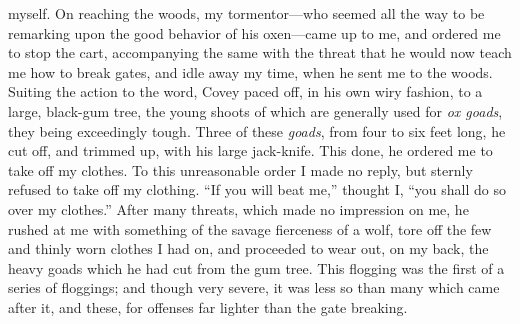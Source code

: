 myself. On reaching the woods, my tormentor---who seemed all the way to
be remarking upon the good behavior of his oxen---came up to me, and
ordered me to stop the cart, accompanying the same with the threat that
he would now teach me how to break gates, and idle away my time, when he
sent me to the woods. Suiting the action to the word, Covey paced off,
in his own wiry fashion, to a large, black-gum tree, the young shoots of
which are generally used for \emph{ox goads}, they being exceedingly
tough. Three of these \emph{goads}, from four to six feet long, he cut
off, and trimmed up, with his large jack-knife. This done, he ordered me
to take off my clothes. To this unreasonable order I made no reply, but
sternly refused to take off my clothing. ``If you will beat me,''
thought I, ``you shall do so over my clothes.'' After many threats,
which made no impression on me, he rushed at me with something of the
savage fierceness of a wolf, tore off the few and thinly worn clothes I
had on, and proceeded to wear out, on my back, the heavy goads which he
had cut from the gum tree. This flogging was the first of a series of
floggings; and though very severe, it was less so than many which came
after it, and these, for offenses far lighter than the gate breaking.

